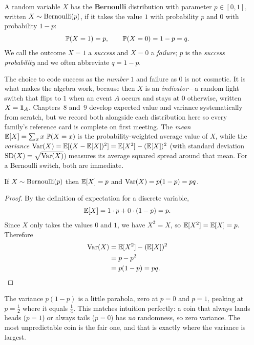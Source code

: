 \begin{definition}
\label{ch07:def-bernoulli}
A random variable $X$ has the \textbf{Bernoulli} distribution with parameter
$p \in [0,1]$, written $X \sim \Bern(p)$, if it takes the value $1$ with
probability $p$ and $0$ with probability $1-p$:
\[
  \P(X = 1) = p, \qquad \P(X = 0) = 1 - p = q.
\]
We call the outcome $X=1$ a \emph{success} and $X=0$ a \emph{failure}; $p$ is the
\emph{success probability} and we often abbreviate $q = 1-p$.
\end{definition}

The choice to code success as the \emph{number} $1$ and failure as $0$ is not
cosmetic. It is what makes the algebra work, because then $X$ is an
\emph{indicator}---a random light switch that flips to $1$ when an event $A$
occurs and stays at $0$ otherwise, written $X = \ind_A$.
Chapters~8 and~9 develop expected value and variance systematically from scratch,
but we record both alongside each distribution here so every family's reference
card is complete on first meeting. The \emph{mean} $\E[X] = \sum_x x\,\P(X=x)$ is
the probability-weighted average value of $X$, while the \emph{variance}
$\Var(X) = \E[(X-\E[X])^2] = \E[X^2] - (\E[X])^2$ (with standard deviation
$\SD(X) = \sqrt{\Var(X)}$) measures its average squared spread around that mean.
For a Bernoulli switch, both are immediate.

\begin{proposition}
\label{ch07:bern-moments}
If $X \sim \Bern(p)$ then $\E[X] = p$ and $\Var(X) = p(1-p) = pq$.
\end{proposition}

\begin{proof}
By the definition of expectation for a discrete variable,
\[
  \E[X] = 1 \cdot p + 0 \cdot (1-p) = p.
\]
Since $X$ only takes the values $0$ and $1$, we have $X^2 = X$, so
$\E[X^2] = \E[X] = p$. Therefore
\begin{align*}
  \Var(X) &= \E[X^2] - (\E[X])^2 \\
  &= p - p^2 \\
  &= p(1-p) = pq. \qedhere
\end{align*}
\end{proof}

\begin{intuitionbox}
The variance $p(1-p)$ is a little parabola, zero at $p=0$ and $p=1$, peaking at
$p = \tfrac12$ where it equals $\tfrac14$. This matches intuition perfectly: a
coin that always lands heads ($p=1$) or always tails ($p=0$) has \emph{no}
randomness, so zero variance. The most unpredictable coin is the fair one, and
that is exactly where the variance is largest.
\end{intuitionbox}

